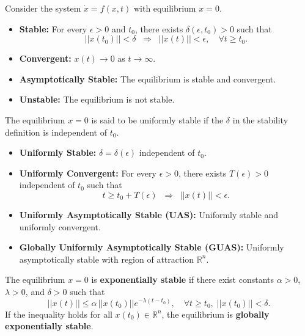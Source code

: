 \begin{definition}
Consider the system $\dot{x}=f(x,t)$ with equilibrium $x=0$.  
\begin{itemize}
    \item \textbf{Stable:} For every $\epsilon>0$ and $t_0$, there exists $\delta(\epsilon,t_0)>0$ such that
    \[
    ||x(t_0)|| < \delta \;\; \Rightarrow \;\; ||x(t)|| < \epsilon, \quad \forall t \geq t_0.
    \]
    \item \textbf{Convergent:} $x(t) \to 0$ as $t \to \infty$.
    \item \textbf{Asymptotically Stable:} The equilibrium is stable and convergent.  
    \item \textbf{Unstable:} The equilibrium is not stable.  
\end{itemize}
\end{definition}

\begin{definition}
The equilibrium $x=0$ is said to be uniformly stable if the $\delta$ in the stability definition is independent of $t_0$.  
\begin{itemize}
    \item \textbf{Uniformly Stable:} $\delta = \delta(\epsilon)$ independent of $t_0$.  
    \item \textbf{Uniformly Convergent:} For every $\epsilon>0$, there exists $T(\epsilon)>0$ independent of $t_0$ such that
    \[
    t \geq t_0 + T(\epsilon) \;\; \Rightarrow \;\; ||x(t)|| < \epsilon.
    \]
    \item \textbf{Uniformly Asymptotically Stable (UAS):} Uniformly stable and uniformly convergent.  
    \item \textbf{Globally Uniformly Asymptotically Stable (GUAS):} Uniformly asymptotically stable with region of attraction $\mathbb{R}^n$.  
\end{itemize}
\end{definition}

\begin{definition}
The equilibrium $x=0$ is \textbf{exponentially stable} if there exist constants $\alpha>0$, $\lambda>0$, and $\delta>0$ such that
\[
||x(t)|| \leq \alpha \, ||x(t_0)|| e^{-\lambda (t-t_0)}, \quad \forall t \geq t_0, \; ||x(t_0)|| < \delta.
\]
If the inequality holds for all $x(t_0)\in\mathbb{R}^n$, the equilibrium is \textbf{globally exponentially stable}.
\end{definition}

